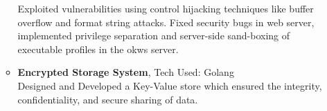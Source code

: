 \documentclass[10pt]{extarticle}
\begin{document}
\begin{itemize}
\begin{itemize}
Exploited vulnerabilities using control hijacking techniques like buffer overflow and format string attacks. Fixed security bugs in web server, implemented privilege separation and server-side sand-boxing of executable profiles in the okws server.
\item \textbf{Encrypted Storage System}, Tech Used: Golang\\
Designed and Developed a Key-Value store which ensured the integrity, confidentiality, and secure sharing of data.
\end{itemize}

\end{itemize}
\vspace{-2mm}
\end{document}
